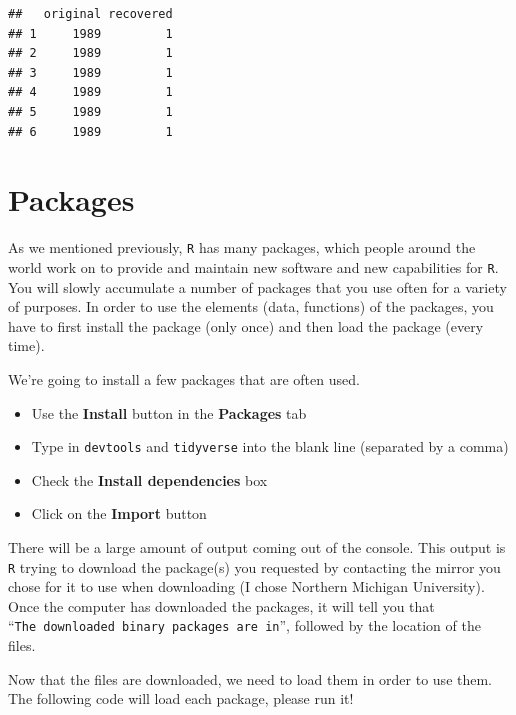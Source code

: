 \documentclass[]{article}
\providecommand{\tightlist}{%
  \setlength{\itemsep}{0pt}\setlength{\parskip}{0pt}}
\begin{document}
\begin{verbatim}
##   original recovered
## 1     1989         1
## 2     1989         1
## 3     1989         1
## 4     1989         1
## 5     1989         1
## 6     1989         1
\end{verbatim}

\section{Packages}\label{packages}

As we mentioned previously, \texttt{R} has many packages, which people
around the world work on to provide and maintain new software and new
capabilities for \texttt{R}. You will slowly accumulate a number of
packages that you use often for a variety of purposes. In order to use
the elements (data, functions) of the packages, you have to first
install the package (only once) and then load the package (every time).

We're going to install a few packages that are often used.

\begin{itemize}
\tightlist
\item
  Use the \textbf{Install} button in the \textbf{Packages} tab\\
\item
  Type in \texttt{devtools} and \texttt{tidyverse} into the blank line
  (separated by a comma)\\
\item
  Check the \textbf{Install dependencies} box\\
\item
  Click on the \textbf{Import} button
\end{itemize}

\newpage 

There will be a large amount of output coming out of the console. This
output is \texttt{R} trying to download the package(s) you requested by
contacting the mirror you chose for it to use when downloading (I chose
Northern Michigan University). Once the computer has downloaded the
packages, it will tell you that
``\texttt{The\ downloaded\ binary\ packages\ are\ in}'', followed by the
location of the files.

Now that the files are downloaded, we need to load them in order to use
them. The following code will load each package, please run it!

\vspace{0.25cm}
\end{document}
